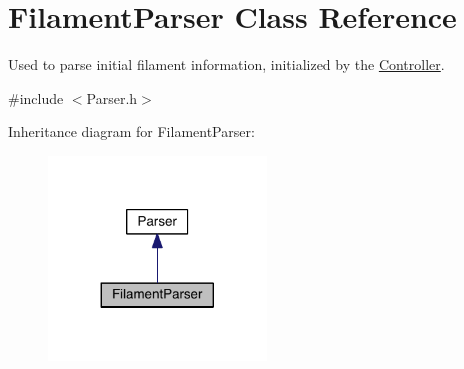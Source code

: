 \hypertarget{classFilamentParser}{\section{Filament\+Parser Class Reference}
\label{classFilamentParser}
}


Used to parse initial filament information, initialized by the \hyperlink{classController}{Controller}.  




{\ttfamily \#include $<$Parser.\+h$>$}



Inheritance diagram for Filament\+Parser\+:\nopagebreak
\begin{figure}[H]
\begin{center}
\leavevmode
\includegraphics[width=164pt]{classFilamentParser__inherit__graph}
\end{center}
\end{figure}


